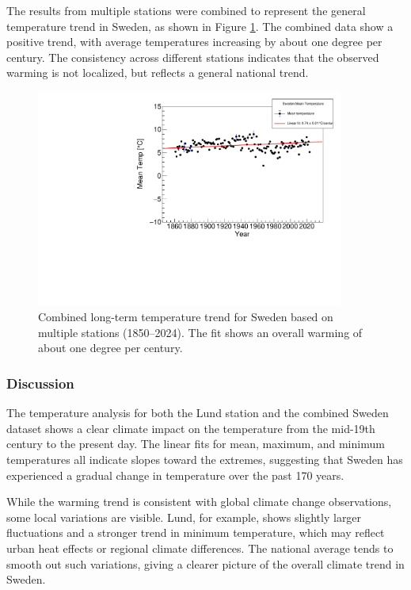 The results from multiple stations were combined to represent the general temperature trend in Sweden, as shown in Figure \ref{fig:sweden_trend}. The combined data show a positive trend, with average temperatures increasing by about one degree per century. The consistency across different stations indicates that the observed warming is not localized, but reflects a general national trend.

\begin{figure}[H]
    \centering
    \includegraphics[width=0.9\textwidth]{plots/mean_temps/Sweden_mean_trend.pdf}
    \caption{Combined long-term temperature trend for Sweden based on multiple stations (1850--2024). The fit shows an overall warming of about one degree per century.}
    \label{fig:sweden_trend}
\end{figure}

\subsubsection{Discussion}

The temperature analysis for both the Lund station and the combined Sweden dataset shows a clear climate impact on the temperature from the mid-19th century to the present day. The linear fits for mean, maximum, and minimum temperatures all indicate slopes toward the extremes, suggesting that Sweden has experienced a gradual change in temperature over the past 170 years.

While the warming trend is consistent with global climate change observations, some local variations are visible. Lund, for example, shows slightly larger fluctuations and a stronger trend in minimum temperature, which may reflect urban heat effects or regional climate differences. The national average tends to smooth out such variations, giving a clearer picture of the overall climate trend in Sweden.

